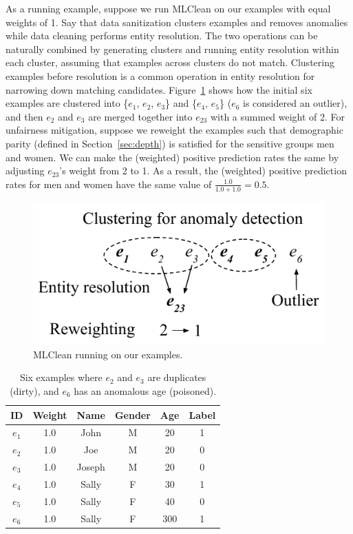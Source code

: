 \documentclass[11pt]{article}
\newcommand{\mc}{MLClean}
\begin{document}
As a running example, suppose we run \mc{} on our examples with equal weights of 1. Say that data sanitization clusters examples and removes anomalies while data cleaning performs entity resolution. The two operations can be naturally combined by generating clusters and running entity resolution within each cluster, assuming that examples across clusters do not match. Clustering examples before resolution is a common operation in entity resolution for narrowing down matching candidates. Figure~\ref{fig:mlclean} shows how the initial six examples are clustered into \{$e_1$, $e_2$, $e_3$\} and \{$e_4$, $e_5$\} ($e_6$ is considered an outlier), and then $e_2$ and $e_3$ are merged together into $e_{23}$ with a summed weight of 2. 
%
For unfairness mitigation, suppose we reweight \cite{DBLP:journals/kais/KamiranC11} the examples such that demographic parity (defined in Section~\ref{sec:depth}) is satisfied for the sensitive groups men and women. We can make the (weighted) positive prediction rates the same by adjusting $e_{23}$'s weight from 2 to 1. As a result, the (weighted) positive prediction rates for men and women have the same value of  $\frac{1.0}{1.0 + 1.0} = 0.5$.

\begin{figure}
	\centering
  	\includegraphics[scale=0.6]{submissions/responsible-ai/figs/mlcleanexample.pdf}
	\caption{\mc{} running on our examples.}%
	\label{fig:mlclean}  
\end{figure}

\begin{table}
	\centering
    \begin{tabular}{| c | c | c | c | c | c |}
    \hline
    {\bf ID} & {\bf Weight} & {\bf Name} & {\bf Gender} & {\bf Age} & {\bf Label} \\\hline \hline
    $e_1$ & 1.0 & John & M & 20 & 1  \\\hline
    $e_2$ & 1.0 & Joe & M & 20 & 0 \\\hline
    $e_3$ & 1.0 & Joseph & M & 20 & 0 \\\hline
    $e_4$ & 1.0 & Sally & F & 30 & 1  \\\hline
    $e_5$ & 1.0 & Sally & F & 40 & 0  \\\hline
    $e_6$ & 1.0 & Sally & F & 300 & 1 \\\hline
    \end{tabular}
	\caption{Six examples where $e_2$ and $e_3$ are duplicates (dirty), and $e_6$ has an anomalous age (poisoned).}
\end{table}
\end{document}
